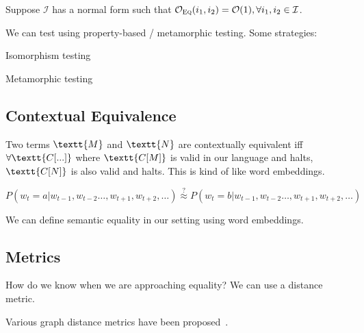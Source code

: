 \documentclass[11pt]{article}
\begin{document}
    Suppose $\mathcal{I}$ has a normal form such that $\mathcal{O}_{\textsc{Eq}}(i_1, i_2) = \mathcal{O}(1), \forall i_1, i_2 \in \mathcal{I}$.

    We can test using property-based / metamorphic testing. Some strategies:

    Isomorphism testing

    Metamorphic testing

    \subsection{Contextual Equivalence}


    Two terms $\textt{M}$ and $\textt{N}$ are contextually equivalent iff $\forall \textt{C[...]}$ where $\textt{C[M]}$ is valid in our language and halts, $\textt{C[N]}$ is also valid and halts. This is kind of like word embeddings.

    $P(w_t = a | w_{t-1}, w_{t-2}\ldots, w_{t+1}, w_{t+2}, \ldots)\overset{?}{\approx} P(w_t = b | w_{t-1}, w_{t-2}\ldots, w_{t+1}, w_{t+2}, \ldots)$

    We can define semantic equality in our setting using word embeddings.

%
%

    \subsection{Metrics}\label{sec:probabilistic}

    How do we know when we are approaching equality? We can use a distance metric.


    Various graph distance metrics have been proposed~\citet{sanfeliu1983distance}.
\end{document}
